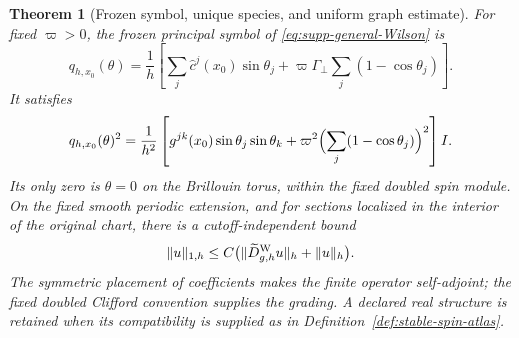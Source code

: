 \documentclass[11pt]{article}
\newtheorem{theorem}{Theorem}[section]
\theoremstyle{definition}
\theoremstyle{remark}
\theoremstyle{definition}
\theoremstyle{remark}
\begin{document}
\begin{theorem}[Frozen symbol, unique species, and uniform graph estimate]
\label{thm:supp-general-Wilson-ellipticity}
For fixed $\varpi>0$, the frozen principal symbol of
\eqref{eq:supp-general-Wilson} is
\begin{equation}
 q_{h,x_0}(\theta)=\frac1h\left[
 \sum_j\widehat c^j(x_0)\sin\theta_j
 +\varpi\Gamma_\perp\sum_j(1-\cos\theta_j)\right].
 \label{eq:supp-general-frozen-symbol}
\end{equation}
It satisfies
\begin{equation}
 q_{h,x_0}(\theta)^2=\frac1{h^2}\left[
 g^{jk}(x_0)\sin\theta_j\sin\theta_k
 +\varpi^2\Bigl(\sum_j(1-\cos\theta_j)\Bigr)^2\right]I.
 \label{eq:supp-general-frozen-square}
\end{equation}
Its only zero is $\theta=0$ on the Brillouin torus, within the fixed doubled spin module.  On the fixed smooth
periodic extension, and for sections localized in the interior of the original
chart, there is a cutoff-independent bound
\begin{equation}
 \|u\|_{1,h}\le C\bigl(\|\widetilde D_{g,h}^{\rm W}u\|_h+\|u\|_h\bigr).
 \label{eq:supp-general-Garding}
\end{equation}
The symmetric placement of coefficients makes the finite operator self-adjoint;
the fixed doubled Clifford convention supplies the grading.  A declared
real structure is retained when its compatibility is supplied as in
Definition~\ref{def:stable-spin-atlas}.
\end{theorem}
\end{document}
